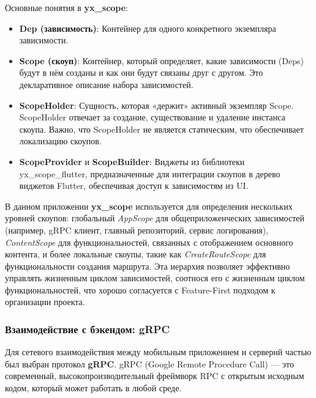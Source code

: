 Основные понятия в \textbf{yx\_scope}:
\begin{itemize}
    \item \textbf{Dep (зависимость)}: Контейнер для одного конкретного экземпляра зависимости.
    \item \textbf{Scope (скоуп)}: Контейнер, который определяет, какие зависимости (Deps) будут в нём созданы и как они будут связаны друг с другом. Это декларативное описание набора зависимостей.
    \item \textbf{ScopeHolder}: Сущность, которая «держит» активный экземпляр Scope. ScopeHolder отвечает за создание, существование и удаление инстанса скоупа. Важно, что ScopeHolder не является статическим, что обеспечивает локализацию скоупов.
    \item \textbf{ScopeProvider} и \textbf{ScopeBuilder}: Виджеты из библиотеки yx\_scope\_flutter, предназначенные для интеграции скоупов в дерево виджетов Flutter, обеспечивая доступ к зависимостям из UI.
\end{itemize}

В данном приложении \textbf{yx\_scope} используется для определения нескольких уровней скоупов: глобальный \textit{AppScope} для общеприложенческих зависимостей (например, gRPC клиент, главный репозиторий, сервис логирования), \textit{ContentScope} для функциональностей, связанных с отображением основного контента, и более локальные скоупы, такие как \textit{CreateRouteScope} для функциональности создания маршрута. Эта иерархия позволяет эффективно управлять жизненным циклом зависимостей, соотнося его с жизненным циклом функциональностей, что хорошо согласуется с Feature-First подходом к организации проекта.



\subsubsection*{Взаимодействие с бэкендом: gRPC}
Для сетевого взаимодействия между мобильным приложением и сервернй частью был выбран протокол \textbf{gRPC}. gRPC (Google Remote Procedure Call) — это современный, высокопроизводительный фреймворк RPC с открытым исходным кодом, который может работать в любой среде.

